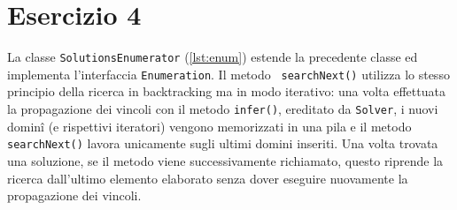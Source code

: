 \section*{Esercizio 4}

La classe {\tt SolutionsEnumerator} (\autoref{lst:enum}) estende la precedente
classe ed implementa l'interfaccia {\tt Enumeration}. Il metodo {\tt
searchNext()} utilizza lo stesso principio della ricerca in backtracking ma in
modo iterativo: una volta effettuata la propagazione dei vincoli con il metodo
{\tt infer()}, ereditato da {\tt Solver}, i nuovi dominî (e rispettivi
iteratori) vengono memorizzati in una pila e il metodo {\tt searchNext()} lavora
unicamente sugli ultimi domini inseriti. Una volta trovata una soluzione, se il
metodo viene successivamente richiamato, questo riprende la ricerca dall'ultimo
elemento elaborato senza dover eseguire nuovamente la propagazione dei vincoli.


